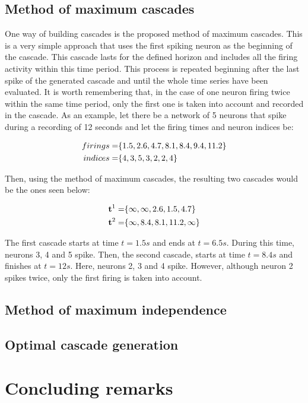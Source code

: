 \subsection{Method of maximum cascades}

One way of building cascades is the proposed method of maximum cascades. This is a very simple approach that uses the first spiking neuron as the beginning of the cascade. This cascade lasts for the defined horizon and includes all the firing activity within this time period. This process is repeated beginning after the last spike of the generated cascade and until the whole time series have been evaluated. It is worth remembering that, in the case of one neuron firing twice within the same time period, only the first one is taken into account and recorded in the cascade. As an example, let there be a network of 5 neurons that spike during a recording of 12 seconds and let the firing times and neuron indices be:

\begin{align}
	\centering
	firings = &\{1.5, 2.6, 4.7, 8.1, 8.4, 9.4, 11.2\}\\
	indices = &\{4,  3,  5,  3,  2,  2, 4\}
\end{align}

Then, using the method of maximum cascades, the resulting two cascades would be the ones seen below:

\begin{align}
	\centering
	\textbf{t}^{1} = &\{\infty, \infty, 2.6, 1.5, 4.7 \}\\
	\textbf{t}^{2} = &\{\infty, 8.4, 8.1, 11.2, \infty \}
\end{align}

The first cascade starts at time \(t=1.5s\) and ends at \(t=6.5s\). During this time, neurons 3, 4 and 5 spike. Then, the second cascade, starts at time \(t=8.4s\) and finishes at \(t=12s\). Here, neurons 2, 3 and 4 spike. However, although neuron 2 spikes twice, only the first firing is taken into account.


\subsection{Method of maximum independence}
\subsection{Optimal cascade generation}
\section{Concluding remarks}

